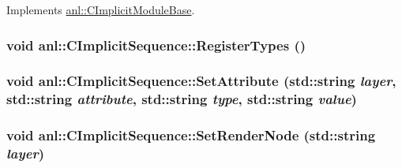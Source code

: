 Implements \hyperlink{classanl_1_1CImplicitModuleBase_ab88f8a1822dcfbc13ba5230318b0acd1}{anl::CImplicitModuleBase}.\hypertarget{classanl_1_1CImplicitSequence_af55b873d0a6a38d8b1ea064ab349cfde}{
\subsubsection[{RegisterTypes}]{\setlength{\rightskip}{0pt plus 5cm}void anl::CImplicitSequence::RegisterTypes ()}}
\label{classanl_1_1CImplicitSequence_af55b873d0a6a38d8b1ea064ab349cfde}
\hypertarget{classanl_1_1CImplicitSequence_a5200549112cf8891fbad9e9459c6ce0c}{
\subsubsection[{SetAttribute}]{\setlength{\rightskip}{0pt plus 5cm}void anl::CImplicitSequence::SetAttribute (std::string {\em layer}, \/  std::string {\em attribute}, \/  std::string {\em type}, \/  std::string {\em value})}}
\label{classanl_1_1CImplicitSequence_a5200549112cf8891fbad9e9459c6ce0c}
\hypertarget{classanl_1_1CImplicitSequence_a29cce3aaba4c9a353ce5d89919804a58}{
\subsubsection[{SetRenderNode}]{\setlength{\rightskip}{0pt plus 5cm}void anl::CImplicitSequence::SetRenderNode (std::string {\em layer})}}
\label{classanl_1_1CImplicitSequence_a29cce3aaba4c9a353ce5d89919804a58}


